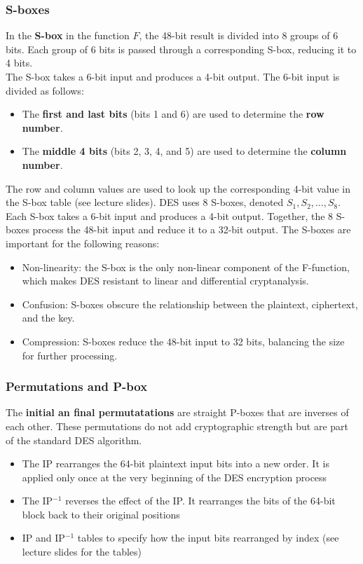 \subsubsection{S-boxes}
In the \textbf{S-box} in the function $F$, the 48-bit result is divided into 8 groups of 6 bits. Each group of 6 bits is passed through a corresponding S-box, reducing it to 4 bits. \\

The S-box takes a 6-bit input and produces a 4-bit output. The 6-bit input is divided as follows:
\begin{itemize}
    \item The \textbf{first and last bits} (bits 1 and 6) are used to determine the \textbf{row number}.
    \item The \textbf{middle 4 bits} (bits 2, 3, 4, and 5) are used to determine the \textbf{column number}.
\end{itemize}

The row and column values are used to look up the corresponding 4-bit value in the S-box table (see lecture slides). DES uses 8 S-boxes, denoted \( S_1, S_2, \dots, S_8 \). Each S-box takes a 6-bit input and produces a 4-bit output. Together, the 8 S-boxes process the 48-bit input and reduce it to a 32-bit output.
The S-boxes are important for the following reasons:
\begin{itemize}
    \item Non-linearity: the S-box is the only non-linear component of the F-function, which makes DES resistant to linear and differential cryptanalysis.
    \item Confusion: S-boxes obscure the relationship between the plaintext, ciphertext, and the key.
    \item Compression: S-boxes reduce the 48-bit input to 32 bits, balancing the size for further processing.
\end{itemize}

\subsubsection{Permutations and P-box}
The \textbf{initial an final permutatations} are straight P-boxes that are inverses of each other. These permutations do not add cryptographic strength but are part of the standard DES algorithm.
\begin{itemize}
    \item The IP rearranges the 64-bit plaintext input bits into a new order. It is applied only once at the very beginning of the DES encryption process
    \item  The IP$^{-1}$ reverses the effect of the IP. It rearranges the bits of the 64-bit block back to their original positions
    \item IP and IP$^{-1}$ tables to specify how the input bits rearranged by index (see lecture slides for the tables)
\end{itemize}


